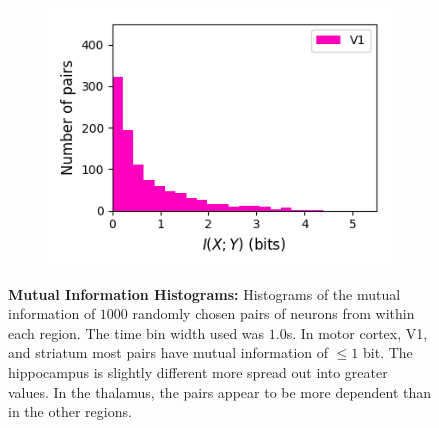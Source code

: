 \documentclass[a4paper,12pt]{article}
\theoremstyle{definition}
\begin{document}
\begin{figure}[p]
\begin{subfigure}{0.5\textwidth}
    \includegraphics[width=\textwidth]{figures/all_v1_6_1p0_information_histogram.png}
  \end{subfigure}
  \caption{\textbf{Mutual Information Histograms:} Histograms of the mutual information of $1000$ randomly chosen pairs of neurons from within each region. The time bin width used was $1.0$s. In motor cortex, V1, and striatum most pairs have mutual information of $\leq 1$ bit. The hippocampus is slightly different more spread out into greater values. In the thalamus, the pairs appear to be more dependent than in the other regions.}
  \label{fig:all_info_histograms}
\end{figure}
\end{document}
